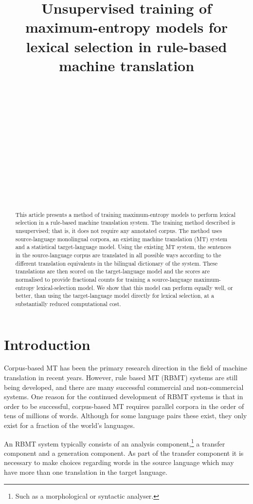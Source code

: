 \documentclass[11pt]{article}
\title{Unsupervised training of maximum-entropy models for lexical
    selection in rule-based machine translation}
\author{
\phantom{Francis M.\ Tyers} \\
\phantom{HSL-fakultehta,} \\
\phantom{UiT Norgga \'{a}rktala\v{s} universitehta,} \\
\phantom{N-9018 Romsa} \\
 \And
\phantom{Felipe S\'anchez-Mart\'inez} \\
\phantom{Dept.\ Lleng.\ i Sist.\ Inform.,} \\
\phantom{Universitat d'Alacant,}\\
\phantom{E-03071 Alacant}\\
 \And
\phantom{Mikel L.\ Forcada} \\
\phantom{Dept.\ Lleng.\ i Sist.\ Inform.,} \\
\phantom{Universitat d'Alacant,}\\
\phantom{E-03071 Alacant}\\
}
\date{}
\begin{document}
\maketitle


\renewcommand{\baselinestretch}{0.97} %

\begin{abstract}
  This article presents a method of training maximum-entropy models to
  perform lexical selection in a rule-based machine translation
  system. The training method described is unsupervised; that is, it
  does not require any annotated corpus. The method uses
  source-language monolingual corpora, an existing machine translation
  (MT) system and a statistical target-language model. Using the
  existing MT system, the sentences in the source-language corpus are
  translated in all possible ways according to the different
  translation equivalents in the bilingual dictionary of the system.
  These translations are then scored on the target-language model and
  the scores are normalised to provide fractional counts for training
  a source-language maximum-entropy lexical-selection model. We show
  that this model can perform equally well, or better, than using the
  target-language model directly for lexical selection, at a
  substantially reduced computational cost.
\end{abstract}


\section{Introduction}

Corpus-based MT has been the primary research direction in the field 
of machine translation in recent years. However, rule based MT (RBMT) systems are 
still being developed, and there are many successful commercial 
and non-commercial systems. One reason for the continued development
of RBMT systems is that in order to be successful, corpus-based MT requires parallel corpora in
the order of tens of millions of words. Although for some language
pairs these exist, they only exist for a fraction of the 
world's languages. 

An RBMT system typically consists of an analysis component,\footnote{Such as
a morphological or syntactic analyser.} a transfer
component and a generation component. As part of the transfer component
it is necessary to make choices regarding words in the source language
which may have more than one translation in the target language.
\end{document}
